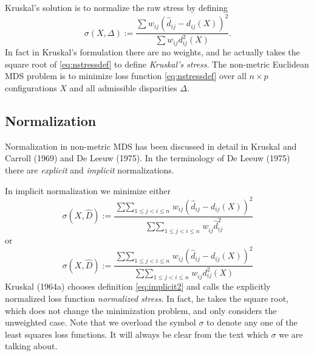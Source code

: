 \documentclass[
  12pt,
]{article}
\newcommand{\jis}{\mathop{\sum\sum}_{1\leq j<i\leq n}}
\begin{document}
Kruskal's solution is to normalize the raw stress by defining
\begin{equation}
\sigma(X,\Delta):=\frac{\sum w_{ij}(\hat d_{ij}-d_{ij}(X))^2}{\sum w_{ij}d_{ij}^2(X)}.
\label{eq:nstressdef}
\end{equation}
In fact in Kruskal's formulation there are no weights, and he actually takes the
square root of \eqref{eq:nstressdef} to define \emph{Kruskal's stress}. The non-metric Euclidean MDS problem is to minimize loss function \eqref{eq:nstressdef} over all \(n\times p\)
configurations \(X\) and all admissible disparities \(\Delta\).

\subsection{Normalization}\label{normalization}

Normalization in non-metric MDS has been discussed in detail in
Kruskal and Carroll (1969) and De Leeuw (1975). In the terminology of
De Leeuw (1975) there are \emph{explicit} and \emph{implicit} normalizations.

In implicit normalization we minimize either
\begin{equation}
\sigma(X,\hat D):=\frac{\jis w_{ij}(\hat d_{ij} -d_{ij}(X))^2}{\jis w_{ij}^{\ }\hat d_{ij}^2}
\label{eq:implicit1}
\end{equation}
or
\begin{equation}
\sigma(X,\hat D):=\frac{\jis w_{ij}(\hat d_{ij}-d_{ij}(X))^2}{\jis w_{ij}^{\ }d_{ij}^2(X) }
\label{eq:implicit2}
\end{equation}
Kruskal (1964a) chooses definition \eqref{eq:implicit2} and calls the explicitly normalized
loss function \emph{normalized stress}. In fact, he takes the square root, which
does not change the minimization problem, and only considers the
unweighted case. Note that we overload the symbol \(\sigma\) to denote any one
of the least squares loss functions. It will always be clear from the
text which \(\sigma\) we are talking about.
\end{document}
